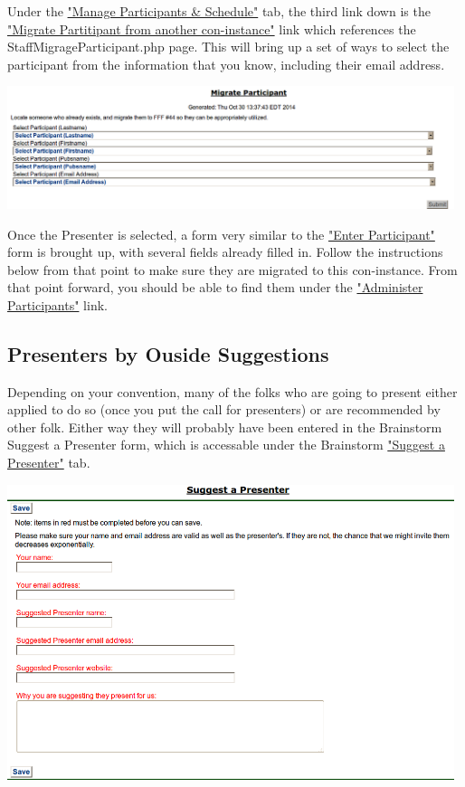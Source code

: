 \documentclass[captions=tablesignature]{scrartcl}
\begin{document}
Under the \hyperref[sec-2]{"Manage Participants \& Schedule"} tab, the third link
down is the \hyperref[sec-2-1-2]{"Migrate Partitipant from another con-instance"} link
which references the StaffMigrageParticipant.php page.  This will
bring up a set of ways to select the participant from the
information that you know, including their email address.

\includegraphics[width=0.98\textwidth]{./Images/Migrate_Participant_Header.png}

Once the Presenter is selected, a form very similar to the
\hyperref[sec-2-3]{"Enter Participant"} form is brought up, with several fields
already filled in.  Follow the instructions below from that point
to make sure they are migrated to this con-instance.  From that
point forward, you should be able to find them under the
\hyperref[sec-3]{"Administer Participants"} link.
\subsection{Presenters by Ouside Suggestions}
\label{sec-2-2}
Depending on your convention, many of the folks who are going to
present either applied to do so (once you put the call for
presenters) or are recommended by other folk.  Either way they
will probably have been entered in the Brainstorm Suggest a
Presenter form, which is accessable under the Brainstorm \hyperref[sec-2-2]{"Suggest a
Presenter"} tab.

\includegraphics[width=0.98\textwidth]{./Images/Brainstorm_Suggest_Presenter.png}
\end{document}
